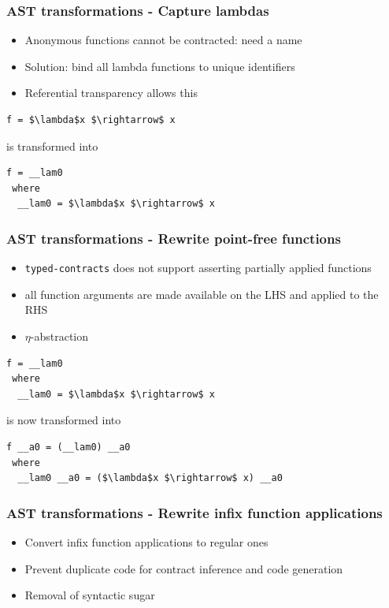 \documentclass[]{beamer}
\begin{document}
\begin{frame}[fragile]
\frametitle{AST transformations - Capture lambdas}

\begin{itemize}
	\item Anonymous functions cannot be contracted: need a name
	\item Solution: bind all lambda functions to unique identifiers
	\item Referential transparency allows this
\end{itemize}

\begin{lstlisting}[mathescape]
f = $\lambda$x $\rightarrow$ x
\end{lstlisting}

is transformed into

\begin{lstlisting}[mathescape]
f = __lam0                   
 where                    
  __lam0 = $\lambda$x $\rightarrow$ x
\end{lstlisting}

\end{frame}

\begin{frame}[fragile]
\frametitle{AST transformations - Rewrite point-free functions}

\begin{itemize}
	\item \texttt{typed-contracts} does not support asserting partially applied functions
	\item all function arguments are made available on the LHS and applied to the RHS
	\item $\eta$-abstraction
\end{itemize}

\begin{lstlisting}[mathescape]
f = __lam0                   
 where                    
  __lam0 = $\lambda$x $\rightarrow$ x
\end{lstlisting}

is now transformed into

\begin{lstlisting}[mathescape]
f __a0 = (__lam0) __a0                
 where                    
  __lam0 __a0 = ($\lambda$x $\rightarrow$ x) __a0
\end{lstlisting}

\end{frame}

\begin{frame}[fragile]
\frametitle{AST transformations - Rewrite infix function applications}

\begin{itemize}
	\item Convert infix function applications to regular ones
	\item Prevent duplicate code for contract inference and code generation
	\item Removal of syntactic sugar
\end{itemize}

\end{frame}
\end{document}
